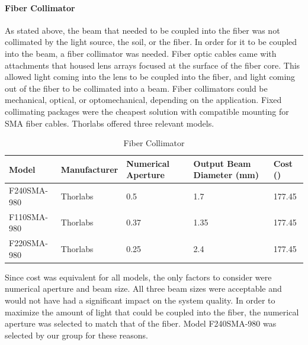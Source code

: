 \paragraph{Fiber Collimator}
As stated above, the beam that needed to be coupled into the fiber was not collimated by the light source, the soil, or the fiber. In order for it to be coupled into the beam, a fiber collimator was needed. Fiber optic cables came with attachments that housed lens arrays focused at the surface of the fiber core. This allowed light coming into the lens to be coupled into the fiber, and light coming out of the fiber to be collimated into a beam. Fiber collimators could be mechanical, optical, or optomechanical, depending on the application. Fixed collimating packages were the cheapest solution with compatible mounting for SMA fiber cables. Thorlabs offered three relevant models.
\begin{table}[H]
	\centering
	\label{table:Fiber Collimator}
	\caption{Fiber Collimator}
	\bigskip
	\begin{tabular}{|p{2cm}|p{2.5cm}|p{2cm}|p{2.75cm}|p{1.75cm}|}
	\hline
	Model & Manufacturer & Numerical Aperture & Output Beam Diameter (mm) & Cost (\textdollar)\\
	\hline
	F240SMA-980 & Thorlabs & 0.5 & 1.7 & 177.45\\
	\hline
	F110SMA-980 & Thorlabs & 0.37 & 1.35 & 177.45\\
	\hline
	F220SMA-980 & Thorlabs & 0.25 & 2.4 & 177.45\\
	\hline
	\end{tabular}
\end{table}
Since cost was equivalent for all models, the only factors to consider were numerical aperture and beam size. All three beam sizes were acceptable and would not have had a significant impact on the system quality. In order to maximize the amount of light that could be coupled into the fiber, the numerical aperture was selected to match that of the fiber. Model F240SMA-980 was selected by our group for these reasons.